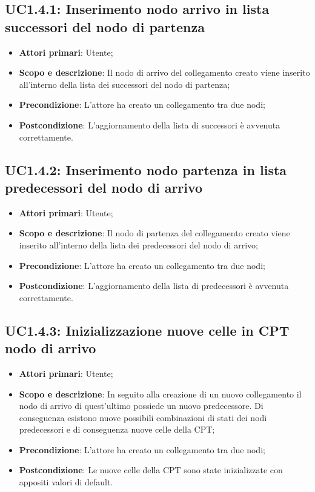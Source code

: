 \subsection{UC1.4.1: Inserimento nodo arrivo in lista successori del nodo di partenza} 
\begin{itemize} 
	\item{\textbf{Attori primari}: Utente;} 
	\item{\textbf{Scopo e descrizione}: Il nodo di arrivo del collegamento creato viene inserito all'interno della lista dei successori del nodo di partenza;} 
	\item{\textbf{Precondizione}: L'attore ha creato un collegamento tra due nodi;} 
	\item{\textbf{Postcondizione}: L'aggiornamento della lista di successori è avvenuta correttamente.} 
\end{itemize} 
\subsection{UC1.4.2: Inserimento nodo partenza in lista predecessori del nodo di arrivo} 
\begin{itemize} 
	\item{\textbf{Attori primari}: Utente;} 
	\item{\textbf{Scopo e descrizione}: Il nodo di partenza del collegamento creato viene inserito all'interno della lista dei predecessori del nodo di arrivo;} 
	\item{\textbf{Precondizione}: L'attore ha creato un collegamento tra due nodi;} 
	\item{\textbf{Postcondizione}: L'aggiornamento della lista di predecessori è avvenuta correttamente.} 
\end{itemize} 
\subsection{UC1.4.3: Inizializzazione nuove celle in CPT nodo di arrivo} 
\begin{itemize} 
	\item{\textbf{Attori primari}: Utente;} 
	\item{\textbf{Scopo e descrizione}: In seguito alla creazione di un nuovo collegamento il nodo di arrivo di quest'ultimo possiede un nuovo predecessore. Di conseguenza esistono nuove possibili combinazioni di stati dei nodi predecessori e di conseguenza nuove celle della CPT;} 
	\item{\textbf{Precondizione}: L'attore ha creato un collegamento tra due nodi;} 
	\item{\textbf{Postcondizione}: Le nuove celle della CPT sono state inizializzate con appositi valori di default.} 
\end{itemize} 
